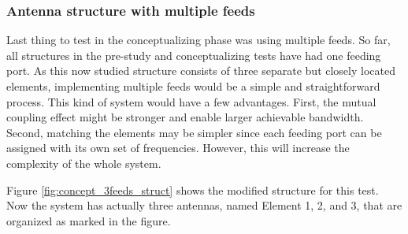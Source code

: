 \subsubsection{Antenna structure with multiple feeds}
\label{sec:multiple_feeds}
Last thing to test in the conceptualizing phase was using multiple feeds. So far, all structures in the pre-study and conceptualizing tests have had one feeding port. As this now studied structure consists of three separate but closely located elements, implementing multiple feeds would be a simple and straightforward process. This kind of system would have a few advantages. First, the mutual coupling effect might be stronger and enable larger achievable bandwidth. Second, matching the elements may be simpler since each feeding port can be assigned with its own set of frequencies. However, this will increase the complexity of the whole system.

Figure \ref{fig:concept_3feeds_struct} shows the modified structure for this test. Now the system has actually three antennas, named Element 1, 2, and 3, that are organized as marked in the figure.

